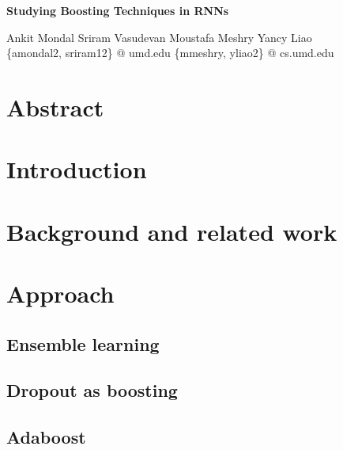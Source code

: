 \documentclass[a4paper,12pt]{article}
\begin{document}
\begin{center}

\textbf{
Studying Boosting Techniques in RNNs\\
}

{\small Ankit Mondal \quad Sriram Vasudevan \qquad Moustafa Meshry \quad Yancy Liao}\\
{\scriptsize \{amondal2, sriram12\} @ umd.edu \qquad \qquad \qquad \{mmeshry, yliao2\} @ cs.umd.edu}
\end{center}

\section{Abstract}





\section{Introduction}




\section{Background and related work}




\section{Approach}

\subsection{Ensemble learning}

\subsection{Dropout as boosting}

\subsection{Adaboost}
\end{document}
